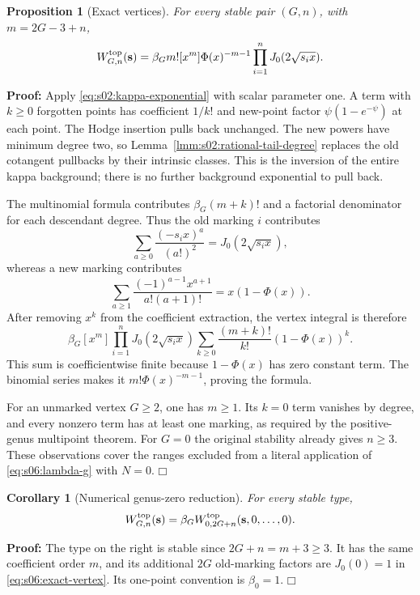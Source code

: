 \documentclass[a4paper,10pt]{article}
\numberwithin{equation}{section}
\theoremstyle{paperplain}
\newtheorem{prp}[thm]{Proposition}
\newtheorem{crl}[thm]{Corollary}
\theoremstyle{paperremark}
\theoremstyle{paperplain}
\newenvironment{prf}{\noindent \textbf{Proof: }}{\hfill $\mdlgwhtsquare$\par\addvspace{0.5\baselineskip}}
\begin{document}
\begin{prp}[Exact vertices]\label{prp:s06:exact-vertex}
For every stable pair $(G,n)$, with $m=2G-3+n$,
\begin{equation}\label{eq:s06:exact-vertex}
 W^{\rm top}_{G,n}(\mathbf s)
 =\beta_G m![x^m]\Phi(x)^{-m-1}
                       \prod_{i=1}^n J_0(2\sqrt{s_i x}).
\end{equation}
\end{prp}
\begin{prf}
Apply \eqref{eq:s02:kappa-exponential} with scalar parameter one.
A term with $k\geq0$ forgotten points has coefficient $1/k!$ and
new-point factor $\psi(1-e^{-\psi})$ at each point.
The Hodge insertion pulls back unchanged. The new powers have
minimum degree two, so Lemma~\ref{lmm:s02:rational-tail-degree}
replaces the old cotangent pullbacks by their intrinsic classes.
This is the inversion of the entire kappa background; there is no
further background exponential to pull back.

The multinomial formula contributes $\beta_G(m+k)!$ and a
factorial denominator for each descendant degree. Thus the old
marking $i$ contributes
\[
 \sum_{a\geq0}\frac{(-s_i x)^a}{(a!)^2}
       =J_0(2\sqrt{s_i x}),
\]
whereas a new marking contributes
\[
 \sum_{a\geq1}\frac{(-1)^{a-1}x^{a+1}}{a!(a+1)!}
       =x(1-\Phi(x)).
\]
After removing $x^k$ from the coefficient extraction, the vertex
integral is therefore
\[
 \beta_G[x^m]\prod_{i=1}^nJ_0(2\sqrt{s_i x})
       \sum_{k\geq0}\frac{(m+k)!}{k!}(1-\Phi(x))^k.
\]
This sum is coefficientwise finite because $1-\Phi(x)$ has zero
constant term. The binomial series makes it
$m!\Phi(x)^{-m-1}$, proving the formula.

For an unmarked vertex $G\geq2$, one has $m\geq1$. Its $k=0$
term vanishes by degree, and every nonzero term has at least one
marking, as required by the positive-genus multipoint theorem.
For $G=0$ the original stability already gives $n\geq3$.
These observations cover the ranges excluded from a literal
application of \eqref{eq:s06:lambda-g} with $N=0$.
\end{prf}

\begin{crl}[Numerical genus-zero reduction]\label{crl:s06:genus-zero}
For every stable type,
\begin{equation}\label{eq:s06:genus-zero}
 W^{\rm top}_{G,n}(\mathbf s)
 =\beta_G W^{\rm top}_{0,2G+n}(\mathbf s,0,\ldots,0).
\end{equation}
\end{crl}
\begin{prf}
The type on the right is stable since $2G+n=m+3\geq3$.
It has the same coefficient order $m$, and its additional $2G$
old-marking factors are $J_0(0)=1$ in
\eqref{eq:s06:exact-vertex}. Its one-point convention is $\beta_0=1$.
\end{prf}
\end{document}
